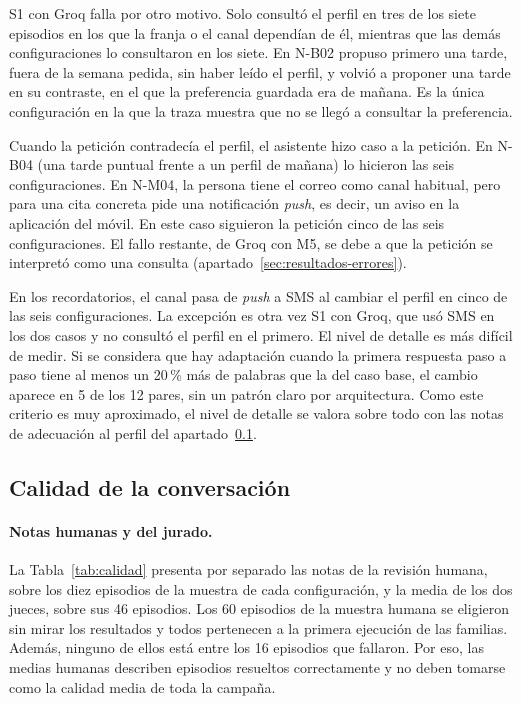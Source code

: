 S1 con Groq falla por otro motivo. Solo consultó el perfil en tres de los siete
episodios en los que la franja o el canal dependían de él, mientras que las
demás configuraciones lo consultaron en los siete. En N-B02 propuso primero una
tarde, fuera de la semana pedida, sin haber leído el perfil, y volvió a
proponer una tarde en su contraste, en el que la preferencia guardada era de
mañana. Es la única configuración en la que la traza muestra que no se llegó a
consultar la preferencia.

Cuando la petición contradecía el perfil, el asistente hizo caso a la petición. En
N-B04 (una tarde puntual frente a un perfil de mañana) lo hicieron las seis
configuraciones. En N-M04, la persona tiene el correo como canal habitual, pero
para una cita concreta pide una notificación \emph{push}, es decir, un aviso en
la aplicación del móvil. En este caso siguieron la petición cinco de las seis
configuraciones. El fallo restante, de Groq con M5, se debe a que la petición
se interpretó como una consulta (apartado~\ref{sec:resultados-errores}).

En los recordatorios, el canal pasa de \emph{push} a SMS al cambiar el perfil
en cinco de las seis configuraciones. La excepción es otra vez S1 con Groq, que
usó SMS en los dos casos y no consultó el perfil en el primero. El nivel de
detalle es más difícil de medir. Si se considera que hay adaptación cuando la
primera respuesta paso a paso tiene al menos un 20\,\% más de palabras que la
del caso base, el cambio aparece en 5 de los 12 pares, sin un patrón claro por
arquitectura. Como este criterio es muy aproximado, el nivel de detalle se
valora sobre todo con las notas de adecuación al perfil del
apartado~\ref{sec:resultados-calidad}.

\subsection{Calidad de la conversación}
\label{sec:resultados-calidad}

\paragraph{Notas humanas y del jurado.}
La Tabla~\ref{tab:calidad} presenta por separado las notas de la revisión
humana, sobre los diez episodios de la muestra de cada configuración, y la
media de los dos jueces, sobre sus 46 episodios. Los 60 episodios de la muestra
humana se eligieron sin mirar los resultados y todos pertenecen a la primera
ejecución de las familias. Además, ninguno de ellos está entre los 16 episodios
que fallaron. Por eso, las medias humanas describen episodios resueltos
correctamente y no deben tomarse como la calidad media de toda la campaña.

